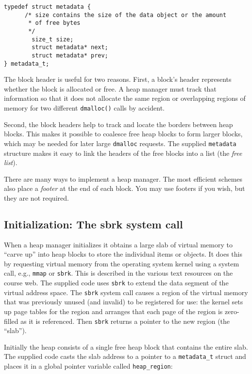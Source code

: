 \documentclass[a4paper,10pt]{article}
\begin{document}
\begin{lstlisting}
typedef struct metadata {
      /* size contains the size of the data object or the amount 
       * of free bytes 
       */
        size_t size;
        struct metadata* next;
        struct metadata* prev; 
} metadata_t;
\end{lstlisting}

The block header is useful for two reasons. First, a block's header represents whether
the block is allocated or free.  A heap manager must track that
information so that it
does not allocate the same region or overlapping regions of memory for
two different \texttt{dmalloc()} calls by accident. 

Second, the block headers help to track and locate the borders between
heap blocks.   This makes it possible to coalesce free heap blocks to
form larger blocks, which may be needed for later large \texttt{dmalloc}
requests.  The supplied
\texttt{metadata} structure makes it easy to link the headers of the free blocks
into a list (the {\it free list}).   

There are many ways to implement a heap manager.  The most efficient
schemes also place a {\it footer} at the end of each block.   You may
use footers if you wish, but they are not required.   

\subsection{Initialization: The sbrk system call}

When a heap manager initializes it obtains a large slab of virtual
memory to ``carve up'' into heap blocks to store the individual items
or objects.
It does this by requesting virtual memory from the
operating system kernel using a system call, e.g., \texttt{mmap} or
\texttt{sbrk}.   This is described in the various text resources on the
course web.   The supplied
code uses \texttt{sbrk} to extend the data segment of the virtual
address space.  The \texttt{sbrk} system call causes a region of the virtual memory
that was previously unused (and invalid) to be registered for use: the
kernel sets up page tables for the region and arranges that each page
of the region is zero-filled as it is referenced.  Then  \texttt{sbrk}
returns a pointer to the new region (the ``slab'').

Initially the heap consists of a single
free heap block that contains the entire slab.  The supplied code casts
the slab address to a pointer to a \texttt{metadata\_t} struct and
places it in a global pointer variable
called \texttt{heap\_region}:
\end{document}
